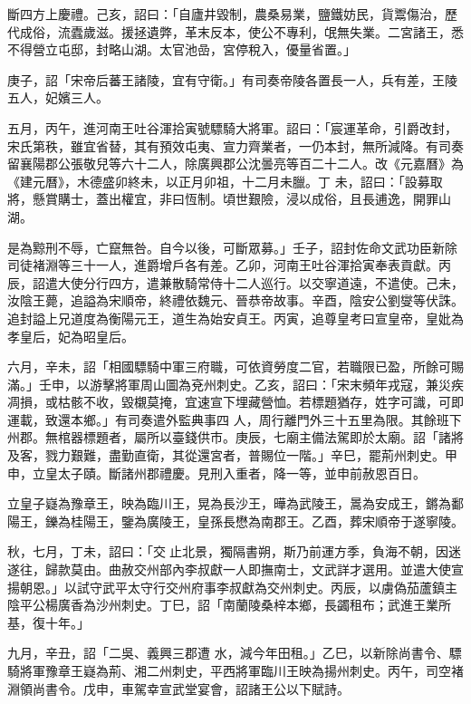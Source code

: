 \begin{pinyinscope}
 斷四方上慶禮。己亥，詔曰：「自廬井毀制，農桑易業，鹽鐵妨民，貨鬻傷治，歷代成俗，流蠹歲滋。援拯遺弊，革末反本，使公不專利，氓無失業。二宮諸王，悉不得營立屯邸，封略山湖。太官池嵒，宮停稅入，優量省置。」



 庚子，詔「宋帝后蕃王諸陵，宜有守衛。」有司奏帝陵各置長一人，兵有差，王陵五人，妃嬪三人。



 五月，丙午，進河南王吐谷渾拾寅號驃騎大將軍。詔曰：「宸運革命，引爵改封，宋氏第秩，雖宜省替，其有預效屯夷、宣力齊業者，一仍本封，無所減降。有司奏留襄陽郡公張敬兒等六十二人，除廣興郡公沈曇亮等百二十二人。改《元嘉曆》為《建元曆》，木德盛卯終未，以正月卯祖，十二月未臘。丁
 未，詔曰：「設募取將，懸賞購士，蓋出權宜，非曰恆制。頃世艱險，浸以成俗，且長逋逸，開罪山湖。



 是為黥刑不辱，亡竄無咎。自今以後，可斷眾募。」壬子，詔封佐命文武功臣新除司徒褚淵等三十一人，進爵增戶各有差。乙卯，河南王吐谷渾拾寅奉表貢獻。丙辰，詔遣大使分行四方，遣兼散騎常侍十二人巡行。以交寧道遠，不遣使。己未，汝陰王薨，追謚為宋順帝，終禮依魏元、晉恭帝故事。辛酉，陰安公劉燮等伏誅。追封謚上兄道度為衡陽元王，道生為始安貞王。丙寅，追尊皇考曰宣皇帝，皇妣為孝皇后，妃為昭皇后。



 六月，辛未，詔「相國驃騎中軍三府職，可依資勞度二官，若職限已盈，所餘可賜滿。」壬申，以游擊將軍周山圖為兗州刺史。乙亥，詔曰：「宋末頻年戎寇，兼災疾凋損，或枯骸不收，毀櫬莫掩，宜速宣下埋藏營恤。若標題猶存，姓字可識，可即運載，致還本鄉。」有司奏遣外監典事四
 人，周行離門外三十五里為限。其餘班下州郡。無棺器標題者，屬所以臺錢供市。庚辰，七廟主備法駕即於太廟。詔「諸將及客，戮力艱難，盡勤直衛，其從還宮者，普賜位一階。」辛巳，罷荊州刺史。甲申，立皇太子賾。斷諸州郡禮慶。見刑入重者，降一等，並申前赦恩百日。



 立皇子嶷為豫章王，映為臨川王，晃為長沙王，曄為武陵王，暠為安成王，鏘為鄱陽王，鑠為桂陽王，鑒為廣陵王，皇孫長懋為南郡王。乙酉，葬宋順帝于遂寧陵。



 秋，七月，丁未，詔曰：「交止北景，獨隔書朔，斯乃前運方季，負海不朝，因迷遂往，歸款莫由。曲赦交州部內李叔獻一人即撫南士，文武詳才選用。並遣大使宣揚朝恩。」以試守武平太守行交州府事李叔獻為交州刺史。丙辰，以虜偽茄蘆鎮主陰平公楊廣香為沙州刺史。丁巳，詔「南蘭陵桑梓本鄉，長蠲租布；武進王業所基，復十年。」



 九月，辛丑，詔「二吳、義興三郡遭
 水，減今年田租。」乙巳，以新除尚書令、驃騎將軍豫章王嶷為荊、湘二州刺史，平西將軍臨川王映為揚州刺史。丙午，司空褚淵領尚書令。戊申，車駕幸宣武堂宴會，詔諸王公以下賦詩。




\end{pinyinscope}
